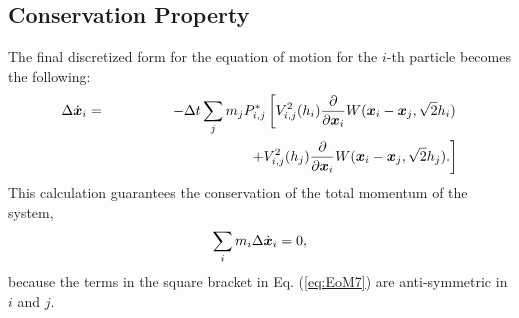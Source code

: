 \documentclass{cjour}
\newcommand{ \Vec   }[1]{ \mbox{\boldmath $ #1 $} }
\newcommand{ \PD    }[2]{ \frac{ \partial #1 }{ \partial #2 } }
\begin{document}
\begin{article}
\subsection{Conservation Property}
                                                   \label{Sec:Cons}
The final discretized form for the equation of motion 
for the $i$-th particle becomes the following: 
\begin{eqnarray}
                \Delta \dot{\Vec{x}}_i
       & = &
              - \Delta t 
                \sum_{j} m_j P^*_{i,j}
                \left[
                       V^2_{i,j}(h_i) \PD{}{\Vec{x}_i} 
                       W(\Vec{x}_i-\Vec{x}_j, \sqrt{2}h_i)
                \right.
                                                        \nonumber \\
       &   & ~~~~~~~~~~~~~~~~~~~~~~~~~~~~~
                \left.
                     + V^2_{i,j}(h_j) \PD{}{\Vec{x}_i} 
                       W(\Vec{x}_i-\Vec{x}_j, \sqrt{2}h_j).
                \right]
                                                         \label{eq:EoM7}
\end{eqnarray}
This calculation guarantees the conservation of the total momentum of 
the system,   
\begin{equation}
                \sum_{i} m_i \Delta \dot{\Vec{x}}_i = 0 ,  
\end{equation}
because the terms in the square bracket in Eq. (\ref{eq:EoM7}) 
are anti-symmetric in $i$ and $j$. 


\end{article}
\end{document}
